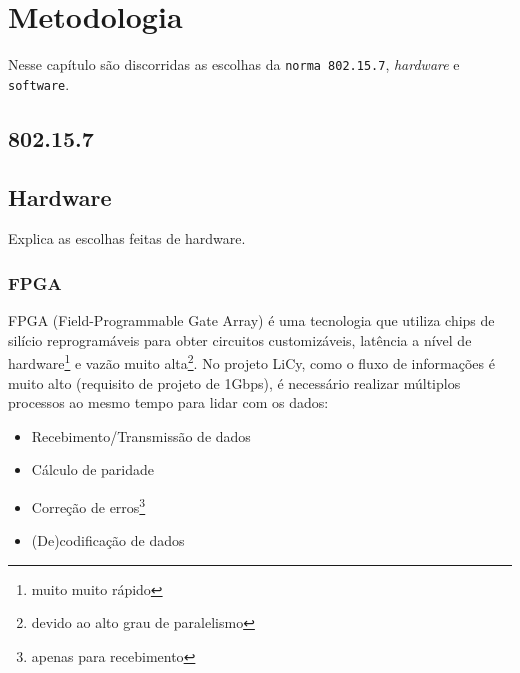 	\chapter{Metodologia}\label{cap-metodologia}
	
	Nesse capítulo são discorridas as escolhas da \texttt{norma 802.15.7}, \textit{hardware} e \texttt{software}.
	\section{802.15.7}\label{sec-norma}
	
	
	
	\section{Hardware}\label{sec-hardware}
	
	Explica as escolhas feitas de hardware.
	
	\subsection{FPGA}\label{hard-fpga}
	
	FPGA (Field-Programmable Gate Array) é uma tecnologia que utiliza chips de silício reprogramáveis para obter circuitos customizáveis, latência a nível de hardware\footnote{muito muito rápido} e vazão muito alta\footnote{devido ao alto grau de paralelismo}. No projeto LiCy, como o fluxo de informações é muito alto (requisito de projeto de 1Gbps), é necessário realizar múltiplos processos ao mesmo tempo para lidar com os dados:
	
	\begin{itemize}  
		\item Recebimento/Transmissão de dados
		\item Cálculo de paridade
		\item Correção de erros\footnote{apenas para recebimento}
		\item (De)codificação de dados
	\end{itemize}
	
